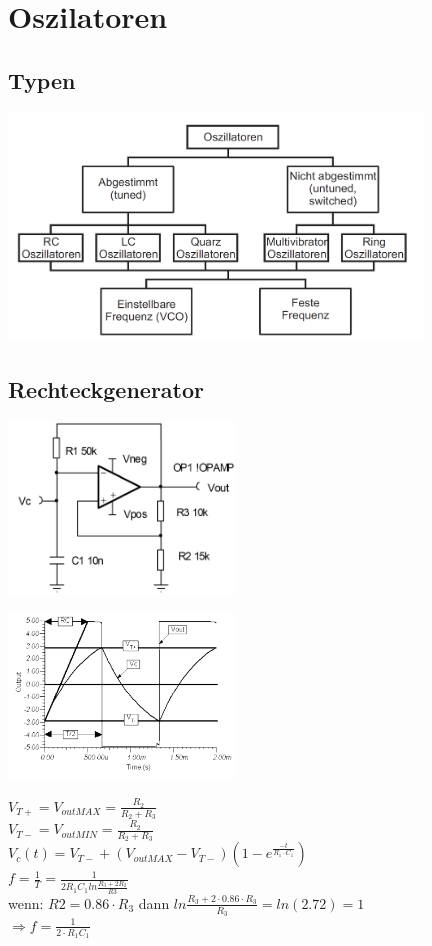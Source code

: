 \section{Oszilatoren}
\subsection{Typen}
	\begin{center}
		\includegraphics[width=11cm]{bilder/osziTypen.png}
	\end{center}
\subsection{Rechteckgenerator}
	\begin{multicols}{3}
		\includegraphics[width=6cm]{bilder/osziRechteck.png}
		\columnbreak
		
		\includegraphics[width=6cm]{bilder/osziRechteckSignal.png}
		\columnbreak
		
		$V_{T+}=V_{outMAX}=\frac{R_2}{R_2+R_3}$\\
		$V_{T-}=V_{outMIN}=\frac{R_2}{R_2+R_3}$\\
		$V_c(t)=V_{T-}+\left(V_{outMAX}-V_{T-}\right)\left(1-e^{\frac{-t}{R_1\cdot
		C_1}}\right)$\\
		$f=\frac{1}{T}=\frac{1}{2R_1C_1 ln \frac{R_3+2R_2}{R3}}$\\
		wenn: $R2 = 0.86 \cdot R_3$ dann $ln\frac{R_3 +2 \cdot 0.86 \cdot R_3}{R_3}=ln
		\left( 2.72 \right) = 1$\\
		$\Longrightarrow f=\frac{1}{2\cdot R_1C_1}$
	\end{multicols}
